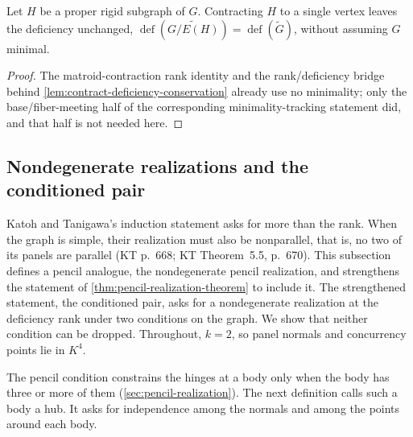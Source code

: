 \begin{lemma}
  \label{lem:pencil-contraction-deficiency}
  \leanok
  Let $H$ be a proper rigid subgraph of $G$. Contracting $H$ to a single
  vertex leaves the deficiency unchanged,
  $\operatorname{def}(\widetilde{G / E(H)}) = \operatorname{def}(\tilde
  G)$, without assuming $G$ minimal.
\end{lemma}
\begin{proof}
  \leanok
  The matroid-contraction rank identity and the rank/deficiency bridge
  behind \cref{lem:contract-deficiency-conservation} already use no
  minimality; only the base/fiber-meeting half of the corresponding
  minimality-tracking statement did, and that half is not needed here.
\end{proof}

\subsection{Nondegenerate realizations and the conditioned pair}
\label{sec:pencil-nondegenerate}

Katoh and Tanigawa's induction statement asks for more than the rank.
When the graph is simple, their realization must also be nonparallel,
that is, no two of its panels are parallel (KT p.~668; KT Theorem~5.5,
p.~670). This subsection defines a pencil analogue, the nondegenerate
pencil realization, and strengthens the statement of
\cref{thm:pencil-realization-theorem} to include it. The strengthened
statement, the conditioned pair, asks for a nondegenerate realization at
the deficiency rank under two conditions on the graph. We show that neither condition can be dropped. Throughout, $k = 2$, so panel normals and concurrency
points lie in $K^4$.

The pencil condition constrains the hinges at a body only when the body
has three or more of them (\cref{sec:pencil-realization}). The next
definition calls such a body a hub. It asks for independence among the
normals and among the points around each body.

